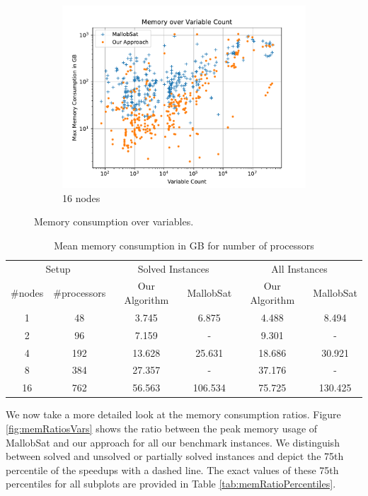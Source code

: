 \documentclass[12pt,a4paper,twoside]{scrartcl}
\numberwithin{equation}{section}
\begin{document}
\begin{figure}
\begin{subfigure}[c]{.45\textwidth}
    \includegraphics[scale=.45]{plots/16node_compare/mem_abs_over_vars.pdf}
    \caption{16 nodes}
  \end{subfigure}
  \caption{Memory consumption over variables.}
  \label{fig:memAbsVars}
\end{figure}

\begin{table}
  \center
  \begin{tabular}{ cccccc }
    \toprule
    \multicolumn{2}{c}{Setup} & \multicolumn{2}{c}{Solved Instances} & \multicolumn{2}{c}{All Instances}\\
    \#nodes & \#processors & Our Algorithm & MallobSat & Our Algorithm & MallobSat \\
    \midrule
    1  & 48  & 3.745  & 6.875   & 4.488   & 8.494\\
    2  & 96  & 7.159  & -       & 9.301   & -\\
    4  & 192 & 13.628 & 25.631  & 18.686  & 30.921\\
    8  & 384 & 27.357 & -       & 37.176  & -\\
    16 & 762 & 56.563 & 106.534 & 75.725 & 130.425\\
    \bottomrule
  \end{tabular}
  \caption{Mean memory consumption in GB for number of processors}
  \label{tab:memMean}
\end{table}

\label{sec:peakMemRatios}
We now take a more detailed look at the memory consumption ratios. Figure \ref{fig:memRatiosVars} shows the ratio between the peak memory usage of MallobSat and our approach for all our benchmark instances. We distinguish between solved and unsolved or partially solved instances and depict the 75th percentile of the speedups with a dashed line. The exact values of these 75th percentiles for all subplots are provided in Table \ref{tab:memRatioPercentiles}.
\end{document}
